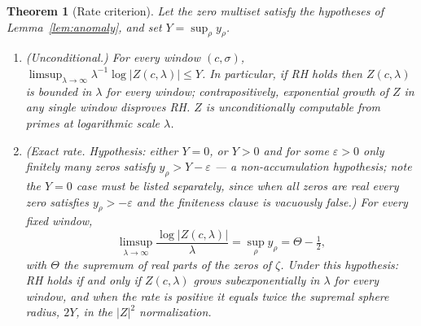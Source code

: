 \documentclass[11pt]{amsart}
\theoremstyle{plain}
\newtheorem{mainthm}{Theorem}
\theoremstyle{definition}
\theoremstyle{remark}
\begin{document}
\begin{mainthm}[Rate criterion]\label{thm:rate}
Let the zero multiset satisfy the hypotheses of Lemma~\ref{lem:anomaly}, and set
$Y=\sup_\rho y_\rho$.
\begin{enumerate}
\item[(a)] \textup{(Unconditional.)} For every window $(c,\sigma)$,
$\limsup_{\lambda\to\infty}\lambda^{-1}\log|Z(c,\lambda)|\le Y$. In particular, if RH holds
then $Z(c,\lambda)$ is bounded in $\lambda$ for every window; contrapositively, exponential
growth of $Z$ in any single window disproves RH. $Z$ is unconditionally computable from primes
at logarithmic scale $\lambda$.
\item[(b)] \textup{(Exact rate. Hypothesis: either $Y=0$, or $Y>0$ and for some $\varepsilon>0$
only finitely many zeros satisfy $y_\rho>Y-\varepsilon$ --- a non-accumulation hypothesis; note
the $Y=0$ case must be listed separately, since when all zeros are real every zero satisfies
$y_\rho>-\varepsilon$ and the finiteness clause is vacuously false.)} For every fixed window,
\[
\limsup_{\lambda\to\infty}\frac{\log|Z(c,\lambda)|}{\lambda}
=\sup_\rho y_\rho=\Theta-\tfrac12,
\]
with $\Theta$ the supremum of real parts of the zeros of $\zeta$. Under this hypothesis:
\emph{RH holds if and only if $Z(c,\lambda)$ grows subexponentially in $\lambda$ for every
window}, and when the rate is positive it equals twice the supremal sphere radius, $2Y$, in the
$|Z|^2$ normalization.
\end{enumerate}
\end{mainthm}
\end{document}
